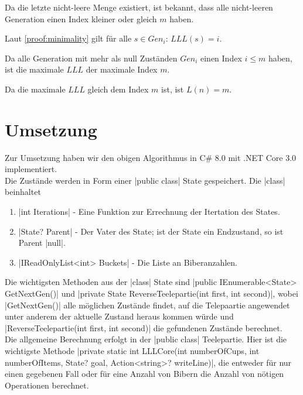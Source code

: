 \documentclass[a4paper,10pt,ngerman]{scrartcl}
\begin{document}
Da die letzte nicht-leere Menge existiert, ist bekannt, dass alle nicht-leeren Generation einen Index kleiner oder gleich \(m\) haben.

Laut \cref{proof:minimality} gilt für alle \(s \in Gen_i\): \(LLL(s) = i\).

Da alle Generation mit mehr als null Zuständen \(Gen_i\) einen Index \(i \leq m\) haben, ist die maximale \(LLL\) der maximale Index \(m\).

Da die maximale \(LLL\) gleich dem Index \(m\) ist, ist \(L(n) = m\).

\section{Umsetzung}
Zur Umsetzung haben wir den obigen Algorithmus in C\# 8.0 mit
.NET Core 3.0 implementiert.\\
Die Zustände werden in Form einer |public class| State gespeichert.
Die |class| beinhaltet

\begin{enumerate}
    \item |int Iterations| - 
        Eine Funktion zur Errechnung der Itertation des States.
    \item |State? Parent| - 
        Der Vater des State; ist der State ein Endzustand, so ist Parent |null|.
    \item |IReadOnlyList<int> Buckets| - Die Liste an Biberanzahlen.
\end{enumerate}
Die wichtigsten Methoden aus der |class| State sind |public IEnumerable<State> GetNextGen()| und |private State ReverseTeelepartie(int first, int second)|, wobei |GetNextGen()| alle möglichen Zustände findet, auf die Telepaartie angewendet unter anderem der aktuelle Zustand heraus kommen würde und |ReverseTeelepartie(int first, int second)| die gefundenen Zustände berechnet. \\
Die allgemeine Berechnung erfolgt in der |public class| Teelepartie. Hier ist die wichtigste Methode |private static int LLLCore(int numberOfCups, int numberOfItems, State? goal, Action<string>? writeLine)|, die entweder für nur einen gegebenen Fall oder für eine Anzahl von Bibern die Anzahl von nötigen Operationen berechnet.
\end{document}
